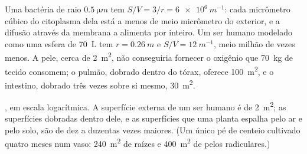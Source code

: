 \begin{example}\label{ex:b1:organism-environment:svnumbers}
Uma bactéria de raio $\qty{0.5}{\micro m}$ tem
$S/V = 3/r = \qty{6e6}{m^{-1}}$: cada micrômetro cúbico do citoplasma
dela está a menos de meio micrômetro do exterior, e a difusão através da
membrana a alimenta por inteiro. Um ser humano modelado como uma esfera
de \qty{70}{L} tem $r = \qty{0.26}{m}$ e $S/V = \qty{12}{m^{-1}}$, meio
milhão de vezes menos. A pele, cerca de \qty{2}{m^2}, não conseguiria
fornecer o oxigênio que \qty{70}{kg} de tecido consomem; o pulmão,
dobrado dentro do tórax, oferece \qty{100}{m^2}, e o intestino, dobrado
três vezes sobre si mesmo, \qty{30}{m^2}.
\end{example}

\begin{omfigure}

{\small {}, em escala logarítmica. A superfície
externa de um ser humano é de \qty{2}{m^2}; as superfícies dobradas
dentro dele, e as superfícies que uma planta espalha pelo ar e pelo
solo, são de dez a duzentas vezes maiores. (Um único pé de centeio
cultivado quatro meses num vaso: \qty{240}{m^2} de raízes e
\qty{400}{m^2} de pelos radiculares.)}
\end{omfigure}

